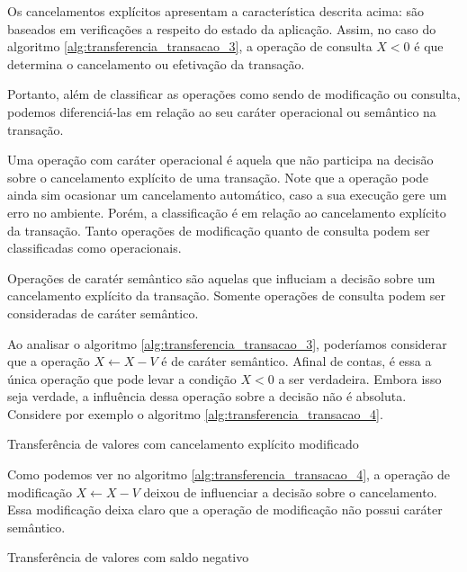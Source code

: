 \documentclass[11pt,twoside,a4paper]{book}
\begin{document}
Os cancelamentos explícitos apresentam a característica descrita acima: são baseados em verificações a respeito do estado da aplicação. Assim, no caso do algoritmo \ref{alg:transferencia_transacao_3}, a operação de consulta $X < 0$ é que determina o cancelamento ou efetivação da transação.

Portanto, além de classificar as operações como sendo de modificação ou consulta, podemos diferenciá-las em relação ao seu caráter operacional ou semântico na transação.

Uma operação com caráter operacional é aquela que não participa na decisão sobre o cancelamento explícito de uma transação. Note que a operação pode ainda sim ocasionar um cancelamento automático, caso a sua execução gere um erro no ambiente. Porém, a classificação é em relação ao cancelamento explícito da transação. Tanto operações de modificação quanto de consulta podem ser classificadas como operacionais.

Operações de caratér semântico são aquelas que influciam a decisão sobre um cancelamento explícito da transação. Somente operações de consulta podem ser consideradas de caráter semântico.

Ao analisar o algoritmo \ref{alg:transferencia_transacao_3}, poderíamos considerar que a operação $X \gets X - V$ é de caráter semântico. Afinal de contas, é essa a única operação que pode levar a condição $X < 0$ a ser verdadeira. Embora isso seja verdade, a influência dessa operação sobre a decisão não é absoluta. Considere por exemplo o algoritmo \ref{alg:transferencia_transacao_4}.

\begin{algorithm}
\caption{Transferência de valores com cancelamento explícito modificado}
\label{alg:transferencia_transacao_4}
\end{algorithm}

Como podemos ver no algoritmo \ref{alg:transferencia_transacao_4}, a operação de modificação $X \gets X - V$ deixou de influenciar a decisão sobre o cancelamento. Essa modificação deixa claro que a operação de modificação não possui caráter semântico.

\begin{algorithm}
\caption{Transferência de valores com saldo negativo}
\label{alg:transferencia_transacao_5}
\end{algorithm}
\end{document}
